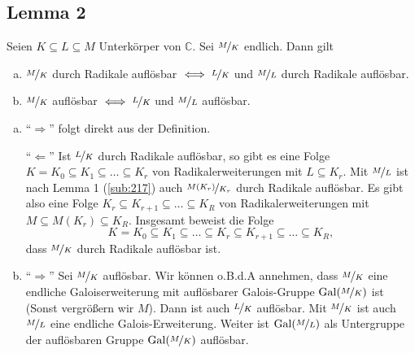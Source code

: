 \subsection[Lemma 2: Transitivität der beiden Auflösbarkeitsbegriffe]{Lemma 2} %
\label{sub:218}
Seien $K \subseteq L \subseteq M$ Unterkörper von $\mathds{C}$. Sei $\nicefrac{M}{K}$ endlich. Dann gilt
\begin{enumerate}[a)]
	\item $\nicefrac{M}{K}$ durch Radikale auflösbar $\iff \nicefrac{L}{K}$ und $\nicefrac{M}{L}$ durch Radikale auflösbar.
	\item $\nicefrac{M}{K}$ auflösbar $\iff \nicefrac{L}{K}$ und $\nicefrac{M}{L}$ auflösbar.
\end{enumerate}
\begin{enumerate}[a)]
	\item \enquote{$\Longrightarrow$} folgt direkt aus der Definition.
	
	\enquote{$\Longleftarrow$} Ist $\nicefrac{L}{K}$ durch Radikale auflösbar, so gibt es eine Folge $K=K_0 \subseteq K_1 \subseteq \ldots \subseteq K_r$ von 
	Radikalerweiterungen mit $L \subseteq K_r$. Mit $\nicefrac{M}{L}$ ist nach Lemma 1 (\ref{sub:217}) auch $\nicefrac{M(K_r)}{K_r}$ durch Radikale auflösbar. Es gibt also
	eine Folge $K_r \subseteq K_{r+1} \subseteq \ldots \subseteq K_R$ von Radikalerweiterungen mit $M \subseteq M(K_r) \subseteq K_R$. Insgesamt beweist die Folge
	\[
		K=K_0 \subseteq K_1 \subseteq \ldots \subseteq K_r \subseteq K_{r+1} \subseteq \ldots \subseteq K_R,
	\]
	dass $\nicefrac{M}{K}$ durch Radikale auflösbar ist.
	\item \enquote{$\Longrightarrow$} Sei $\nicefrac{M}{K}$ auflösbar. Wir können o.B.d.A annehmen, dass $\nicefrac{M}{K}$ eine endliche Galoiserweiterung mit 
	auflösbarer Galois-Gruppe $\operatorname{Gal}(\nicefrac{M}{K})$ ist (Sonst vergrößern wir $M$). Dann ist auch $\nicefrac{L}{K}$ auflösbar. Mit $\nicefrac{M}{K}$ ist auch 
	$\nicefrac{M}{L}$ eine endliche Galois-Erweiterung. Weiter ist $\operatorname{Gal}(\nicefrac{M}{L})$ als Untergruppe der auflösbaren Gruppe $\operatorname{Gal}(\nicefrac{M}{K})$ auflösbar.
	
	
	

\end{enumerate}
